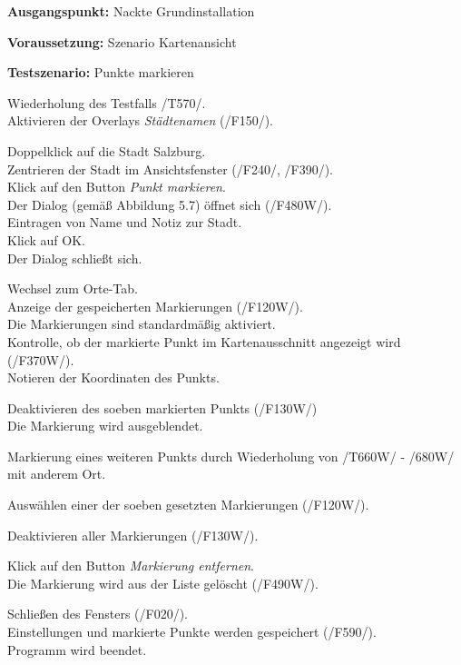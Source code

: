\documentclass[10pt]{scrreprt}
\newcommand{\sfbf}[1]{\textbf{\sffamily #1}}
\newcommand{\ziel}[1]{{\fontsize{9.5}{11}\textsf{/#1/}}}
\newcommand{\ziellabel}{Z}
\newcommand{\wunsch}{\renewcommand{\labelenumi}{\textbf{\ziel{\ziellabel\numprint{\theenumi}0W}}}}
\newenvironment{details}[1][6pt]{%
  \parskip#1 \parindent6mm \raggedright%
  \def\item{\par\ignorespaces\hangindent=5mm \hangafter1}}{%
  \par\ignorespaces}
\begin{document}
\newpage
\vspace{1.0cm}
\begin{details}[2pt]
\item \sfbf{Ausgangspunkt:} Nackte Grundinstallation 
\item \sfbf{Voraussetzung:} Szenario Kartenansicht
\item \sfbf{Testszenario:} Punkte markieren
\end{details}
\vspace{2mm}
\begin{enumerate}[leftmargin = 2.2cm, resume]
\wunsch
\item Wiederholung des Testfalls \ziel{T570}.\\Aktivieren der Overlays \textit{Städtenamen} (\ziel{F150}).
\item Doppelklick auf die Stadt Salzburg.\\Zentrieren der Stadt im Ansichtsfenster (\ziel{F240}, \ziel{F390}).\\Klick auf den Button \textit{Punkt markieren}.\\Der Dialog (gemäß Abbildung 5.7) öffnet sich (\ziel{F480W}).\\Eintragen von Name und Notiz zur Stadt.\\Klick auf OK.\\Der Dialog schließt sich.
\item Wechsel zum Orte-Tab.\\Anzeige der gespeicherten Markierungen (\ziel{F120W}).\\Die Markierungen sind standardmäßig aktiviert.\\Kontrolle, ob der markierte Punkt im Kartenausschnitt angezeigt wird (\ziel{F370W}).\\Notieren der Koordinaten des Punkts.
\item Deaktivieren des soeben markierten Punkts (\ziel{F130W}) \\Die Markierung wird ausgeblendet.
\item Markierung eines weiteren Punkts durch Wiederholung von \ziel{T660W} - \ziel{680W} mit anderem Ort.
\item Auswählen einer der soeben gesetzten Markierungen (\ziel{F120W}).
\item Deaktivieren aller Markierungen (\ziel{F130W}).
\item Klick auf den Button \textit{Markierung entfernen}.\\Die Markierung wird aus der Liste gelöscht (\ziel{F490W}).
\item Schließen des Fensters (\ziel{F020}).\\Einstellungen und markierte Punkte werden gespeichert (\ziel{F590}).\\Programm wird beendet.
\end{enumerate}
\end{document}
